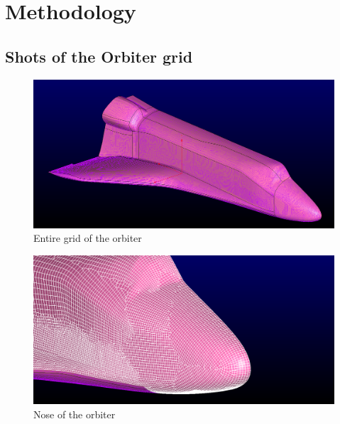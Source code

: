 \section{Methodology}

\subsection{Shots of the Orbiter grid}



\begin{figure}[H]
 \centering
 \includegraphics[width=\textwidth]{report_images/ss_surface_grid.png}
 \caption{Entire grid of the orbiter}
 \label{fig: ss_entire_grid}
\end{figure}

\begin{figure}[H]
 \centering
 \includegraphics[width=\textwidth]{report_images/ss_nose_LE.png}
 \caption{Nose of the orbiter}
 \label{fig: ss_nose_LE}
\end{figure}

